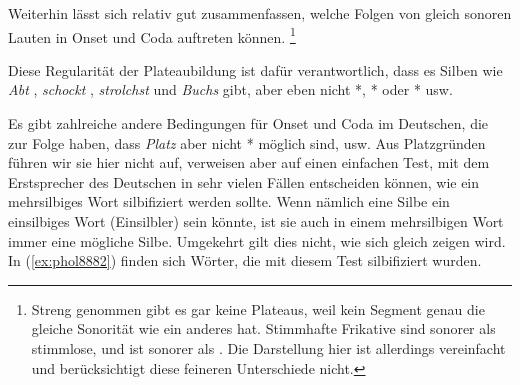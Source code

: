 Weiterhin lässt sich relativ gut zusammenfassen, welche Folgen von gleich sonoren Lauten in Onset und Coda auftreten können.%
\footnote{Streng genommen gibt es gar keine Plateaus, weil kein Segment genau die gleiche Sonorität wie ein anderes hat.
Stimmhafte Frikative sind \zB sonorer als stimmlose, und \textipa{[k]} ist sonorer als \textipa{[t]}.
Die Darstellung hier ist allerdings vereinfacht und berücksichtigt diese feineren Unterschiede nicht.}


Diese Regularität der Plateaubildung ist dafür verantwortlich, dass es Silben wie \textit{Abt} \textipa{[Papt]}, \textit{schockt} \textipa{[SOkt]}, \textit{strolchst} \textipa{[StrOl\c{c}st]} und \textit{Buchs} \textipa{[bu:Xs]} gibt, aber eben nicht *\textipa{[Patp]}, *\textipa{[tkant@]} oder *\textipa{[nOXf]} usw.

Es gibt zahlreiche andere Bedingungen für Onset und Coda im Deutschen, die zur Folge haben, dass \zB \textit{Platz} \textipa{[pla\t{ts}]} aber nicht *\textipa{[tla\t{ts}]} möglich sind, usw.
Aus Platzgründen führen wir sie hier nicht auf, verweisen aber auf einen einfachen Test, mit dem Erstsprecher des Deutschen in sehr vielen Fällen entscheiden können, wie ein mehrsilbiges Wort silbifiziert werden sollte.
Wenn nämlich eine Silbe ein einsilbiges Wort (Einsilbler) sein könnte, ist sie auch in einem mehrsilbigen Wort immer eine mögliche Silbe.
Umgekehrt gilt dies nicht, wie sich gleich zeigen wird.
In (\ref{ex:phol8882}) finden sich Wörter, die mit diesem Test silbifiziert wurden.

\begin{exe}
  \ex\label{ex:phol8882}
  \begin{xlist}
  \end{xlist}
\end{exe}

